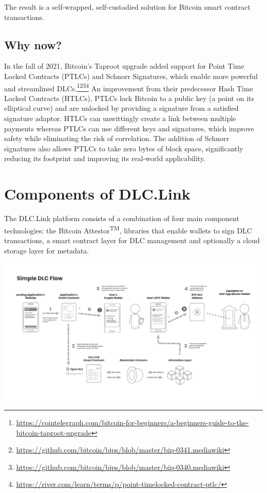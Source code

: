 \documentclass[twoside, a4paper, 11pt]{article}
\begin{document}
  The result is a self-wrapped, self-custodied solution for Bitcoin smart contract transactions.

  \subsection{Why now?}
  In the fall of 2021, Bitcoin’s Taproot upgrade added support for Point Time Locked Contracts (PTLCs) and Schnorr Signatures, which enable more powerful and streamlined DLCs.\footnote{\url{https://cointelegraph.com/bitcoin-for-beginners/a-beginners-guide-to-the-bitcoin-taproot-upgrade}}\footnote{\url{https://github.com/bitcoin/bips/blob/master/bip-0341.mediawiki}}\footnote{\url{https://github.com/bitcoin/bips/blob/master/bip-0340.mediawiki}}\footnote{\url{https://river.com/learn/terms/p/point-timelocked-contract-ptlc/}} An improvement from their predecessor Hash Time Locked Contracts (HTLCs), PTLCs lock Bitcoin to a public key (a point on its elliptical curve) and are unlocked by providing a signature from a satisfied signature adaptor. HTLCs can unwittingly create a link between multiple payments whereas PTLCs can use different keys and signatures, which improve safety while eliminating the risk of correlation. The addition of Schnorr signatures also allows PTLCs to take zero bytes of block space, significantly reducing its footprint and improving its real-world applicability.

  \section{Components of DLC.Link}

  The DLC.Link platform consists of a combination of four main component technologies: the Bitcoin Attestor\textsuperscript{TM}, libraries that enable wallets to sign DLC transactions, a smart contract layer for DLC management and optionally a cloud storage layer for metadata.
  \begin{center}
    \includegraphics[width=\textwidth]{simple_dlc_flow}
  \end{center}
\end{document}
